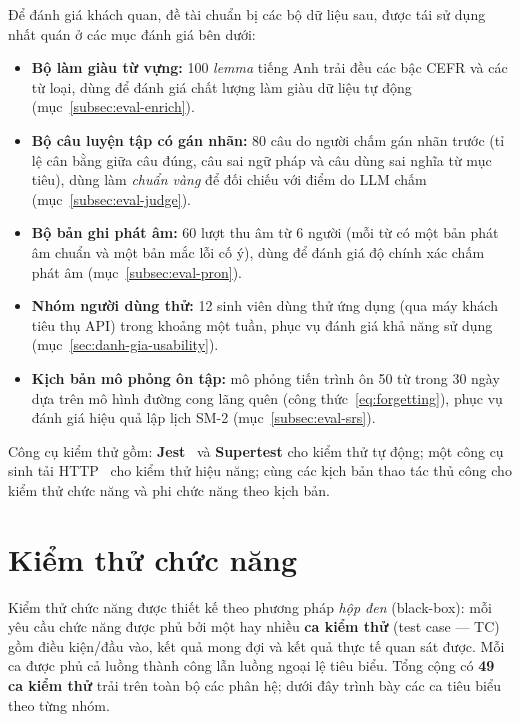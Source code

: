 Để đánh giá khách quan, đề tài chuẩn bị các bộ dữ liệu sau, được tái sử dụng
nhất quán ở các mục đánh giá bên dưới:

\begin{itemize}
  \item \textbf{Bộ làm giàu từ vựng:} 100 \textit{lemma} tiếng Anh trải đều
        các bậc CEFR và các từ loại, dùng để đánh giá chất lượng làm giàu dữ
        liệu tự động (mục~\ref{subsec:eval-enrich}).
  \item \textbf{Bộ câu luyện tập có gán nhãn:} 80 câu do người chấm gán nhãn
        trước (tỉ lệ cân bằng giữa câu đúng, câu sai ngữ pháp và câu dùng sai
        nghĩa từ mục tiêu), dùng làm \textit{chuẩn vàng} để đối chiếu với điểm
        do LLM chấm (mục~\ref{subsec:eval-judge}).
  \item \textbf{Bộ bản ghi phát âm:} 60 lượt thu âm từ 6 người (mỗi từ có một
        bản phát âm chuẩn và một bản mắc lỗi cố ý), dùng để đánh giá độ chính
        xác chấm phát âm (mục~\ref{subsec:eval-pron}).
  \item \textbf{Nhóm người dùng thử:} 12 sinh viên dùng thử ứng dụng (qua máy
        khách tiêu thụ API) trong khoảng một tuần, phục vụ đánh giá khả năng
        sử dụng (mục~\ref{sec:danh-gia-usability}).
  \item \textbf{Kịch bản mô phỏng ôn tập:} mô phỏng tiến trình ôn 50 từ trong
        30 ngày dựa trên mô hình đường cong lãng quên (công
        thức~\eqref{eq:forgetting}), phục vụ đánh giá hiệu quả lập lịch SM-2
        (mục~\ref{subsec:eval-srs}).
\end{itemize}

Công cụ kiểm thử gồm: \textbf{Jest}~\cite{jest2024} và \textbf{Supertest} cho
kiểm thử tự động; một công cụ sinh tải HTTP~\cite{k6load} cho kiểm thử hiệu
năng; cùng các kịch bản thao tác thủ công cho kiểm thử chức năng và phi chức
năng theo kịch bản.

\section{Kiểm thử chức năng}
\label{sec:kiem-thu-chuc-nang}

Kiểm thử chức năng được thiết kế theo phương pháp \textit{hộp đen} (black-box):
mỗi yêu cầu chức năng được phủ bởi một hay nhiều \textbf{ca kiểm thử}
(test case --- TC) gồm điều kiện/đầu vào, kết quả mong đợi và kết quả thực tế
quan sát được. Mỗi ca được phủ cả luồng thành công lẫn luồng ngoại lệ tiêu
biểu. Tổng cộng có \textbf{49 ca kiểm thử} trải trên toàn bộ các phân hệ;
dưới đây trình bày các ca tiêu biểu theo từng nhóm.

